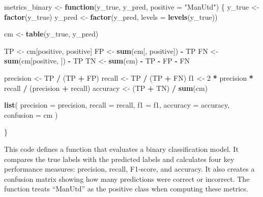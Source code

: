 \documentclass[
]{article}
\newenvironment{Shaded}{\begin{snugshade}}{\end{snugshade}}
\newcommand{\AttributeTok}[1]{\textcolor[rgb]{0.13,0.29,0.53}{#1}}
\newcommand{\ControlFlowTok}[1]{\textcolor[rgb]{0.13,0.29,0.53}{\textbf{#1}}}
\newcommand{\DecValTok}[1]{\textcolor[rgb]{0.00,0.00,0.81}{#1}}
\newcommand{\FunctionTok}[1]{\textcolor[rgb]{0.13,0.29,0.53}{\textbf{#1}}}
\newcommand{\NormalTok}[1]{#1}
\newcommand{\OtherTok}[1]{\textcolor[rgb]{0.56,0.35,0.01}{#1}}
\newcommand{\SpecialCharTok}[1]{\textcolor[rgb]{0.81,0.36,0.00}{\textbf{#1}}}
\newcommand{\StringTok}[1]{\textcolor[rgb]{0.31,0.60,0.02}{#1}}
\begin{document}
\begin{Shaded}
\begin{Highlighting}[]
\NormalTok{metrics\_binary }\OtherTok{\textless{}{-}} \ControlFlowTok{function}\NormalTok{(y\_true, y\_pred, }\AttributeTok{positive =} \StringTok{"ManUtd"}\NormalTok{) \{}
\NormalTok{  y\_true }\OtherTok{\textless{}{-}} \FunctionTok{factor}\NormalTok{(y\_true)}
\NormalTok{  y\_pred }\OtherTok{\textless{}{-}} \FunctionTok{factor}\NormalTok{(y\_pred, }\AttributeTok{levels =} \FunctionTok{levels}\NormalTok{(y\_true))}
  
\NormalTok{  cm }\OtherTok{\textless{}{-}} \FunctionTok{table}\NormalTok{(y\_true, y\_pred)}
  
\NormalTok{  TP }\OtherTok{\textless{}{-}}\NormalTok{ cm[positive, positive]}
\NormalTok{  FP }\OtherTok{\textless{}{-}} \FunctionTok{sum}\NormalTok{(cm[, positive]) }\SpecialCharTok{{-}}\NormalTok{ TP}
\NormalTok{  FN }\OtherTok{\textless{}{-}} \FunctionTok{sum}\NormalTok{(cm[positive, ]) }\SpecialCharTok{{-}}\NormalTok{ TP}
\NormalTok{  TN }\OtherTok{\textless{}{-}} \FunctionTok{sum}\NormalTok{(cm) }\SpecialCharTok{{-}}\NormalTok{ TP }\SpecialCharTok{{-}}\NormalTok{ FP }\SpecialCharTok{{-}}\NormalTok{ FN}
  
\NormalTok{  precision }\OtherTok{\textless{}{-}}\NormalTok{ TP }\SpecialCharTok{/}\NormalTok{ (TP }\SpecialCharTok{+}\NormalTok{ FP)}
\NormalTok{  recall    }\OtherTok{\textless{}{-}}\NormalTok{ TP }\SpecialCharTok{/}\NormalTok{ (TP }\SpecialCharTok{+}\NormalTok{ FN)}
\NormalTok{  f1        }\OtherTok{\textless{}{-}} \DecValTok{2} \SpecialCharTok{*}\NormalTok{ precision }\SpecialCharTok{*}\NormalTok{ recall }\SpecialCharTok{/}\NormalTok{ (precision }\SpecialCharTok{+}\NormalTok{ recall)}
\NormalTok{  accuracy  }\OtherTok{\textless{}{-}}\NormalTok{ (TP }\SpecialCharTok{+}\NormalTok{ TN) }\SpecialCharTok{/} \FunctionTok{sum}\NormalTok{(cm)}
  
  \FunctionTok{list}\NormalTok{(}
    \AttributeTok{precision =}\NormalTok{ precision,}
    \AttributeTok{recall    =}\NormalTok{ recall,}
    \AttributeTok{f1        =}\NormalTok{ f1,}
    \AttributeTok{accuracy  =}\NormalTok{ accuracy,}
    \AttributeTok{confusion =}\NormalTok{ cm}
\NormalTok{  )}

\NormalTok{\}}
\end{Highlighting}
\end{Shaded}

This code defines a function that evaluates a binary classification
model. It compares the true labels with the predicted labels and
calculates four key performance measures: precision, recall, F1-score,
and accuracy. It also creates a confusion matrix showing how many
predictions were correct or incorrect. The function treats ``ManUtd'' as
the positive class when computing these metrics.
\end{document}
